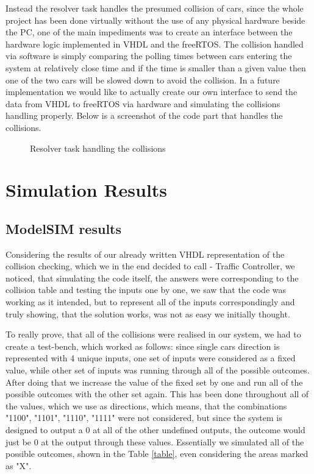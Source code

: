 \documentclass[conference]{IEEEtran}
\begin{document}
Instead the resolver task handles the presumed collision of cars, since the whole project has been done virtually without the use of any physical hardware beside the PC, one of the main impediments was to create an interface between the hardware logic implemented in VHDL and the freeRTOS. The collision handled via software is simply comparing the polling times between cars entering the system at relatively close time and if the time is smaller than a given value then one of the two cars will be slowed down to avoid the collision. In a future implementation we would like to actually create our own interface to send the data from VHDL to freeRTOS via hardware and simulating the collisions handling properly. Below is a screenshot of the code part that handles the collisions.
\begin{figure}[h]
    \caption{Resolver task handling the collisions}
    \label{resolver}
\end{figure}



\section{Simulation Results}

\subsection{ModelSIM results}

Considering the results of our already written VHDL representation of the collision checking, which we in the end decided to call - Traffic Controller, we noticed, that simulating the code itself, the answers were corresponding to the collision table and testing the inputs one by one, we saw that the code was working as it intended, but to represent all of the inputs correspondingly and truly showing, that the solution works, was not as easy we initially thought.

To really prove, that all of the collisions were realised in our system, we had to create a test-bench, which worked as follows: since single cars direction is represented with 4 unique inputs, one set of inputs were considered as a fixed value, while other set of inputs was running through all of the possible outcomes. After doing that we increase the value of the fixed set by one and run all of the possible outcomes with the other set again. This has been done throughout all of the values, which we use as directions, which means, that the combinations "1100", "1101", "1110", "1111" were not considered, but since the system is designed to output a 0 at all of the other undefined outputs, the outcome would just be 0 at the output through these values. Essentially we simulated all of the possible outcomes, shown in the Table \ref{table}, even considering the areas marked as "X".
\end{document}
